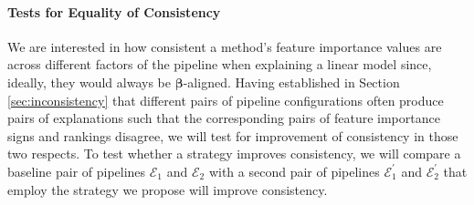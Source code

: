 \documentclass[mnsc,blindrev]{informs3}
\newcommand{\mE}{\mathcal{E}}
\begin{document}
    \paragraph{Tests for Equality of Consistency}
        We are interested in how consistent a method's feature importance values are across different factors of the pipeline when explaining a linear model since, ideally, they would always be $\boldsymbol{\beta}$-aligned. Having established in Section \ref{sec:inconsistency} that different pairs of pipeline configurations often produce pairs of explanations such that the corresponding pairs of feature importance signs and rankings disagree, we will test for improvement of consistency in those two respects. To test whether a strategy improves consistency, we will compare a baseline pair of pipelines $\mE_1$ and $\mathcal{E}_2$ with a second pair of pipelines  $\mE^\prime_1$ and $\mE^\prime_2$ that employ the strategy we propose will improve consistency.
\end{document}
